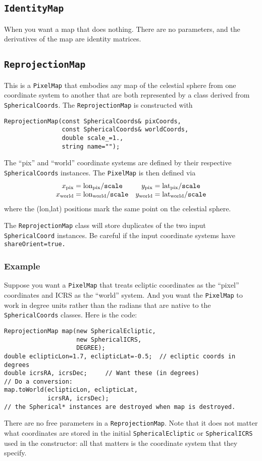 \documentclass[11pt,preprint,flushrt]{aastex}
\begin{document}
\subsection{{\tt IdentityMap}}
When you want a map that does nothing.  There are no parameters, and the derivatives of the map are identity matrices.

\subsection{{\tt ReprojectionMap}}
This is a {\tt PixelMap} that embodies any map of the celestial sphere from one coordinate system to another that are both represented by a class derived from {\tt SphericalCoords}.  The {\tt ReprojectionMap} is constructed with
\begin{verbatim}
ReprojectionMap(const SphericalCoords& pixCoords,
                const SphericalCoords& worldCoords,
                double scale_=1.,
                string name="");
\end{verbatim}
The ``pix'' and ``world'' coordinate systems are defined by their respective {\tt SphericalCoords} instances.  The {\tt PixelMap} is then defined via
\begin{equation}
\begin{array}{cc}
x_{\rm pix} = {\rm lon}_{\rm pix}/{\tt scale} & y_{\rm pix} = {\rm lat}_{\rm pix}/{\tt scale}  \\
x_{\rm world} = {\rm lon}_{\rm world}/{\tt scale} & y_{\rm world} = {\rm lat}_{\rm world}/{\tt scale} 
\end{array}
\end{equation}
where the (lon,lat) positions mark the same point on the celestial sphere.  

The {\tt ReprojectionMap} class will store duplicates of the two input {\tt SphericalCoord} instances.  Be careful if the input coordinate systems have {\tt shareOrient=true.}

\subsubsection{Example}
Suppose you want a {\tt PixelMap} that treats ecliptic coordinates as the ``pixel'' coordinates and ICRS as the ``world'' system.  And you want the {\tt PixelMap} to work in degree units rather than the radians that are native to the {\tt SphericalCoords} classes.  Here is the code:
\begin{verbatim}
ReprojectionMap map(new SphericalEcliptic,
                    new SphericalICRS,
                    DEGREE);
double eclipticLon=1.7, eclipticLat=-0.5;  // ecliptic coords in degrees
double icrsRA, icrsDec;     // Want these (in degrees)
// Do a conversion:
map.toWorld(eclipticLon, eclipticLat,
            icrsRA, icrsDec);
// the Spherical* instances are destroyed when map is destroyed.
\end{verbatim}
There are no free parameters in a {\tt ReprojectionMap}.  Note that it does not matter what coordinates are stored in the initial {\tt SphericalEcliptic} or {\tt SphericalICRS} used in the constructor: all that matters is the coordinate system that they specify.
\end{document}
